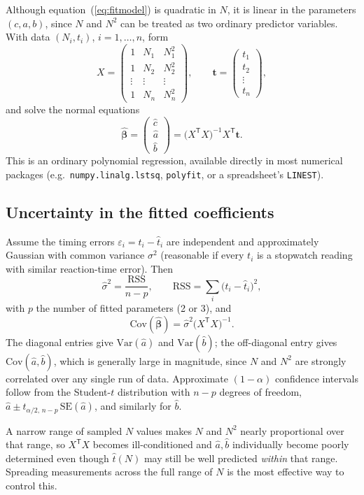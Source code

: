\documentclass[12pt,oneside,a4paper]{article}
\newcommand{\be}{\begin{equation}}
\newcommand{\ee}{\end{equation}}
\begin{document}
Although equation~(\ref{eq:fitmodel}) is quadratic in $N$, it is
linear in the parameters $(c,a,b)$, since $N$ and $N^2$ can be
treated as two ordinary predictor variables. With data
$(N_i,t_i)$, $i=1,\dots,n$, form
\be
X=\begin{pmatrix}1 & N_1 & N_1^2\\ 1& N_2 & N_2^2\\ \vdots & \vdots& \vdots\\ 1& N_n & N_n^2\end{pmatrix},
\qquad
\mathbf t=\begin{pmatrix}t_1\\t_2\\\vdots\\t_n\end{pmatrix},
\ee
and solve the normal equations
\be
\hat{\boldsymbol\beta} = \begin{pmatrix}\hat c\\ \hat a\\ \hat b\end{pmatrix}
  = \bigl(X^{\mathsf T}X\bigr)^{-1}X^{\mathsf T}\mathbf t.
\ee
This is an ordinary polynomial regression, available directly in most
numerical packages (e.g.\ \texttt{numpy.linalg.lstsq},
\texttt{polyfit}, or a spreadsheet's \texttt{LINEST}).

\subsection{Uncertainty in the fitted coefficients}

Assume the timing errors $\varepsilon_i = t_i - \hat t_i$ are
independent and approximately Gaussian with common variance
$\sigma^2$ (reasonable if every $t_i$ is a stopwatch reading with
similar reaction-time error). Then
\be
\hat\sigma^2 = \frac{\mathrm{RSS}}{n-p}, \qquad
\mathrm{RSS} = \sum_i \bigl(t_i - \hat t_i\bigr)^2,
\ee
with $p$ the number of fitted parameters (2 or 3), and
\be
\mathrm{Cov}(\hat{\boldsymbol\beta}) = \hat\sigma^2 \bigl(X^{\mathsf T}X\bigr)^{-1}.
\ee
The diagonal entries give $\mathrm{Var}(\hat a)$ and
$\mathrm{Var}(\hat b)$; the off-diagonal entry gives
$\mathrm{Cov}(\hat a,\hat b)$, which is generally large in magnitude,
since $N$ and $N^2$ are strongly correlated over any single run of
data. Approximate $(1-\alpha)$ confidence intervals follow from the
Student-$t$ distribution with $n-p$ degrees of freedom,
$\hat a \pm t_{\alpha/2,\,n-p}\,\mathrm{SE}(\hat a)$, and similarly
for $\hat b$.

A narrow range of sampled $N$ values makes $N$ and $N^2$ nearly
proportional over that range, so $X^{\mathsf T}X$ becomes
ill-conditioned and $\hat a,\hat b$ individually become poorly
determined even though $\hat t(N)$ may still be well predicted
\emph{within} that range. Spreading measurements across the full
range of $N$ is the most effective way to control this.
\end{document}

